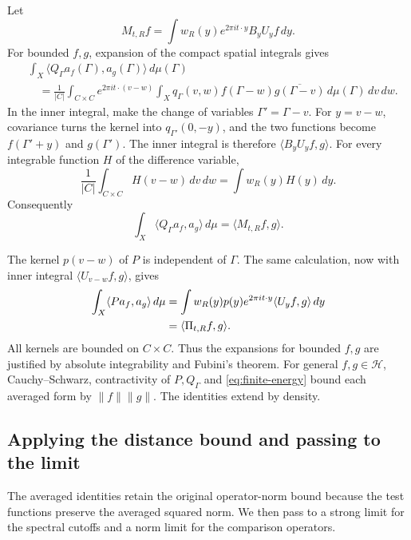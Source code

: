 \documentclass[a4paper,12pt,reqno]{amsart}
\newcommand{\lead}[1]{\par\smallskip\noindent\leavevmode#1\par\smallskip}
\theoremstyle{remark}
\numberwithin{equation}{section}
\newcommand{\Hh}{\mathcal H}
\begin{document}
Let
\begin{equation}\label{eq:finite-M}
 M_{t,R}f=\int w_R(y)e^{2\pi it\cdot y}B_yU_yf\,dy.
\end{equation}
For bounded $f,g$, expansion of the compact spatial integrals gives
\begin{align*}
 &\int_X\langle Q_\Gamma a_f(\Gamma),a_g(\Gamma)\rangle\,d\mu(\Gamma)\\
 &\quad=\frac{1}{|C|}\int_{C\times C}e^{2\pi it\cdot(v-w)}
   \int_X q_\Gamma(v,w)f(\Gamma-w)
                   \overline{g(\Gamma-v)}\,d\mu(\Gamma)\,dv\,dw.
\end{align*}
In the inner integral, make the change of variables $\Gamma'=\Gamma-v$. For $y=v-w$,
covariance turns the kernel into $q_{\Gamma'}(0,-y)$, and the two
functions become $f(\Gamma'+y)$ and $g(\Gamma')$. The inner integral
is therefore $\langle B_yU_yf,g\rangle$. For every integrable function
$H$ of the difference variable,
\[
 \frac{1}{|C|}\int_{C\times C}H(v-w)\,dv\,dw
 =\int w_R(y)H(y)\,dy.
\]
Consequently
\begin{equation}\label{eq:average-Q}
 \int_X\langle Q_\Gamma a_f,a_g\rangle\,d\mu
 =\langle M_{t,R}f,g\rangle.
\end{equation}

The kernel $p(v-w)$ of $P$ is independent of $\Gamma$. The same
calculation, now with inner integral $\langle U_{v-w}f,g\rangle$, gives
\begin{align}
 \int_X\langle Pa_f,a_g\rangle\,d\mu
 &=\int w_R(y)p(y)e^{2\pi it\cdot y}\langle U_yf,g\rangle\,dy\notag\\
 &=\langle\Pi_{t,R}f,g\rangle.
 \label{eq:average-P}
\end{align}
All kernels are bounded on $C\times C$. Thus the expansions for bounded
$f,g$ are justified by absolute integrability and Fubini's theorem. For general $f,g\in\Hh$,
Cauchy--Schwarz, contractivity of $P,Q_\Gamma$ and
\eqref{eq:finite-energy} bound each averaged form by $\|f\|\|g\|$.
The identities extend by density.

\subsection{Applying the distance bound and passing to the limit}

\lead{The averaged identities retain the original operator-norm bound
because the test functions preserve the averaged squared norm. We then
pass to a strong limit for the spectral cutoffs and a norm limit for the
comparison operators.}
\end{document}
